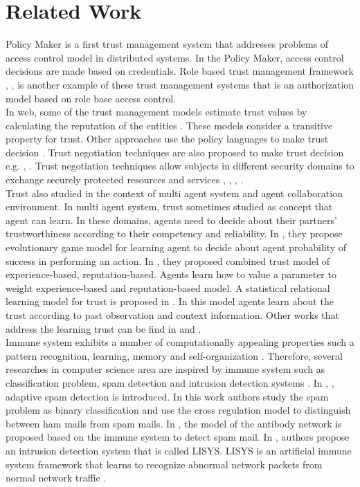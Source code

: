 \documentclass{llncs}
\begin{document}
\section{Related Work}
Policy Maker\cite{blaze} is a first trust management system that addresses problems of access control model in distributed systems.  In the Policy Maker, access control decisions are made based on credentials.  Role based trust management framework \cite{mitchell1}, \cite{mitchell}, \cite{mitchell3} is another example of these trust management systems that is an authorization model based on role base access control. \\

In web, some of the trust management models estimate trust values by calculating the reputation of the entities \cite{reputationWeb}. These models consider a transitive property for trust.  Other approaches  use the policy languages to make trust decision \cite{trustpolicy}.  Trust negotiation techniques are also proposed to make trust decision e.g. \cite{Winslett}, \cite{Winslett2}. Trust negotiation techniques allow subjects in different security domains to exchange securely protected resources and services \cite{Squicciarini}, \cite{Koshutanski}, \cite{Winsborough}, \cite{Winsborough2}. \\

Trust also studied in the context of multi agent system and agent collaboration environment. In multi agent system, trust sometimes studied as concept that agent can learn. In these domains, agents need to decide about their partners’ trustworthiness according to their competency and reliability.  In \cite{competent}, they propose evolutionary game model for learning agent
to decide about agent probability of success in performing an action. In \cite{experince}, they proposed combined trust model of experience-based, reputation-based. Agents learn how to value a parameter to weight experience-based and reputation-based model.  A statistical relational learning model for trust is proposed in \cite{statistical}. In this model agents learn about the trust according to past observation and context information. 
Other works that address the learning trust can be find in \cite{inittrust} and \cite{taskspecific}.\\

Immune system exhibits a number of computationally appealing properties such a pattern recognition, learning, memory and self-organization \cite{aisLearning}. Therefore, several researches in computer science area are inspired by immune system such as classification problem, spam detection and intrusion detection systems  \cite{Forrest1}.  In \cite{Al1}, \cite{Al2}, adaptive spam detection is introduced. In this work authors study the spam problem as binary classification and use the cross regulation model to distinguish between ham mails from spam mails. In \cite{spam}, the model of the antibody network is proposed based on the immune system to detect spam mail. In \cite{Forrest2},  authors propose  an intrusion detection system that is called LISYS.  LISYS is an artificial immune system framework that learns to recognize abnormal network packets from normal network traffic \cite{LISYS}.
\end{document}
